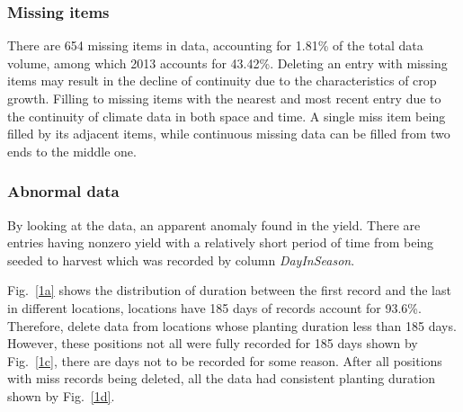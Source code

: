 \documentclass[conference, a4paper]{IEEEtran}
\begin{document}
  \subsubsection{Missing items}
    There are 654 missing items in data, accounting for 1.81\% of the total data volume, among which 2013 accounts for 43.42\%. Deleting an entry with missing items may result in the decline of continuity due to the characteristics of crop growth. Filling to missing items with the nearest and most recent entry due to the continuity of climate data in both space and time. A single miss item being filled by its adjacent items, while continuous missing data can be filled from two ends to the middle one.

  \subsubsection{Abnormal data}
    By looking at the data, an apparent anomaly found in the yield. There are entries having nonzero yield with a relatively short period of time from being seeded to harvest which was recorded by column \textit{DayInSeason}.  

    Fig.~\ref{1a} shows the distribution of duration between the first record and the last in different locations, locations have 185 days of records account for 93.6\%. Therefore, delete data from locations whose planting duration less than 185 days. However, these positions not all were fully recorded for 185 days shown by Fig.~\ref{1c}, there are days not to be recorded for some reason. After all positions with miss records being deleted, all the data had consistent planting duration shown by Fig.~\ref{1d}.
\end{document}
